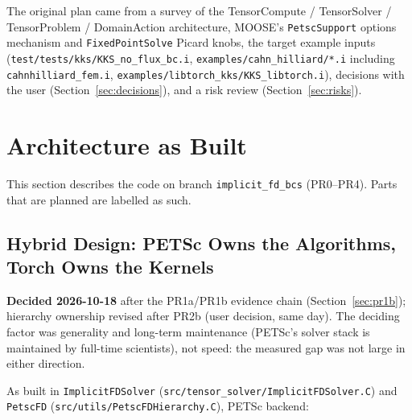 \documentclass[11pt]{article}
\begin{document}
The original plan came from a survey of the TensorCompute / TensorSolver /
TensorProblem / DomainAction architecture, MOOSE's \texttt{PetscSupport}
options mechanism and \texttt{FixedPointSolve} Picard knobs, the target
example inputs (\texttt{test/tests/kks/KKS\_no\_flux\_bc.i},
\texttt{examples/cahn\_hilliard/*.i} including \texttt{cahnhilliard\_fem.i},
\texttt{examples/libtorch\_kks/KKS\_libtorch.i}), decisions with the user
(Section~\ref{sec:decisions}), and a risk review (Section~\ref{sec:risks}).

\section{Architecture as Built}
\label{sec:architecture}

This section describes the code on branch \texttt{implicit\_fd\_bcs}
(PR0--PR4). Parts that are planned are labelled as such.

\subsection{Hybrid Design: PETSc Owns the Algorithms, Torch Owns the Kernels}
\label{sec:hybrid}

\begin{tcolorbox}[colback=lightgray, colframe=marlinblue, boxrule=0.6pt, arc=1mm]
\textbf{Decided 2026-10-18} after the PR1a/PR1b evidence chain
(Section~\ref{sec:pr1b}); hierarchy ownership revised after PR2b (user
decision, same day). The deciding factor was generality and long-term
maintenance (PETSc's solver stack is maintained by full-time scientists),
not speed: the measured gap was not large in either direction.
\end{tcolorbox}

As built in \texttt{ImplicitFDSolver} (\texttt{src/tensor\_solver/ImplicitFDSolver.C})
and \texttt{PetscFD} (\texttt{src/utils/PetscFDHierarchy.C}), PETSc backend:
\end{document}
